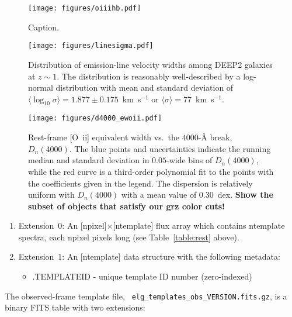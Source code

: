 \documentclass[12pt]{article}
\newcommand{\oii}{[O~{\sc ii}]}
\newcommand{\oiilam}{[O~{\sc ii}]~\ensuremath{\lambda\lambda3726,29}}
\newcommand{\kms}{km~s$^{-1}$}
\begin{document}
\begin{figure}
\centering
\texttt{[image: figures/oiiihb.pdf]}
\caption{Caption. \label{fig:oiiihb}}
\end{figure}


\begin{figure}
\centering
\texttt{[image: figures/linesigma.pdf]}
\caption{Distribution of emission-line velocity widths among DEEP2 galaxies at
  $z\sim1$.  The distribution is reasonably well-described by a log-normal
  distribution with mean and standard deviation of
  $\langle\log_{10}\sigma\rangle=1.877\pm0.175$~\kms{} or
  $\langle\sigma\rangle=77$~\kms.  \label{fig:linesigma}}
\end{figure}

\begin{figure}
\centering
\texttt{[image: figures/d4000\_ewoii.pdf]}
\caption{Rest-frame \oii{} equivalent width vs.~the $4000$-\AA{}
  break, $D_{n}(4000)$.  The blue points and uncertainties indicate
  the running median and standard deviation in $0.05$-wide bins of
  $D_{n}(4000)$, while the red curve is a third-order polynomial fit
  to the points with the coefficients given in the
  legend.  The dispersion is relatively uniform with $D_{n}(4000)$
  with a mean value of $0.30$~dex.  {\bf Show the subset of objects
    that satisfy our grz color cuts!}  \label{fig:d4000}}
\end{figure}



\begin{enumerate}
\item{Extension~0: An [{\sc npixel}]$\times$[{\sc ntemplate}] flux
  array which contains {\sc ntemplate} spectra, each {\sc npixel}
  pixels long (see Table~\ref{table:rest} above).}
\item{Extension~1: An [{\sc ntemplate}] data structure with the
  following metadata:
\begin{itemize}
\item{.{\sc TEMPLATEID} - unique template ID number (zero-indexed)}
\end{itemize}
}
\end{enumerate}

The observed-frame template file, {\tt
  elg\_templates\_obs\_VERSION.fits.gz}, is a binary FITS table with
two extensions:
\end{document}
